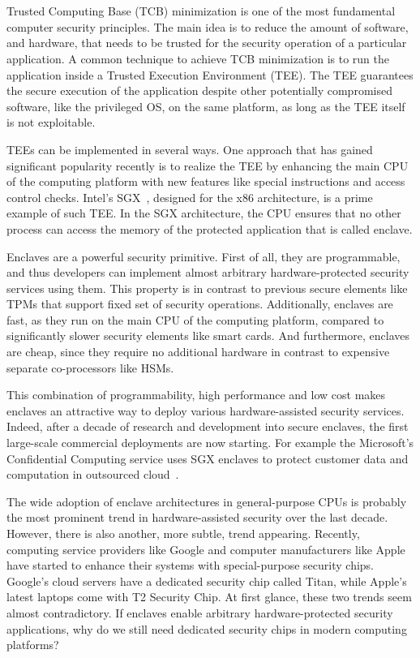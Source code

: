 
\section*{}

Trusted Computing Base (TCB) minimization is one of the most fundamental computer security principles. The main idea is to reduce the amount of software, and hardware, that needs to be trusted for the security operation of a particular application. A common technique to achieve TCB minimization is to run the application inside a Trusted Execution Environment (TEE). The TEE guarantees the secure execution of the application despite other potentially compromised software, like the privileged OS, on the same platform, as long as the TEE itself is not exploitable. 

TEEs can be implemented in several ways. One approach that has gained significant popularity recently is to realize the TEE by enhancing the main CPU of the computing platform with new features like special instructions and access control checks. Intel’s SGX~\cite{sgxexplained}, designed for the x86 architecture, is a prime example of such TEE. In the SGX architecture, the CPU ensures that no other process can access the memory of the protected application that is called enclave. 

Enclaves are a powerful security primitive. First of all, they are programmable, and thus developers can implement almost arbitrary hardware-protected security services using them. This property is in contrast to previous secure elements like TPMs that support fixed set of security operations. Additionally, enclaves are fast, as they run on the main CPU of the computing platform, compared to significantly slower security elements like smart cards. And furthermore, enclaves are cheap, since they require no additional hardware in contrast to expensive separate co-processors like HSMs. 

This combination of programmability, high performance and low cost makes enclaves an attractive way to deploy various hardware-assisted security services. Indeed, after a decade of research and development into secure enclaves, the first large-scale commercial deployments are now starting. For example the Microsoft’s Confidential Computing service uses SGX enclaves to protect customer data and computation in outsourced cloud~\cite{russinovich2017introducing}.

The wide adoption of enclave architectures in general-purpose CPUs is probably the most prominent trend in hardware-assisted security over the last decade. However, there is also another, more subtle, trend appearing. Recently, computing service providers like Google and computer manufacturers like Apple have started to enhance their systems with special-purpose security chips. Google’s cloud servers have a dedicated security chip called Titan, while Apple’s latest laptops come with T2 Security Chip. At first glance, these two trends seem almost contradictory. If enclaves enable arbitrary hardware-protected security applications, why do we still need dedicated security chips in modern computing platforms? 

